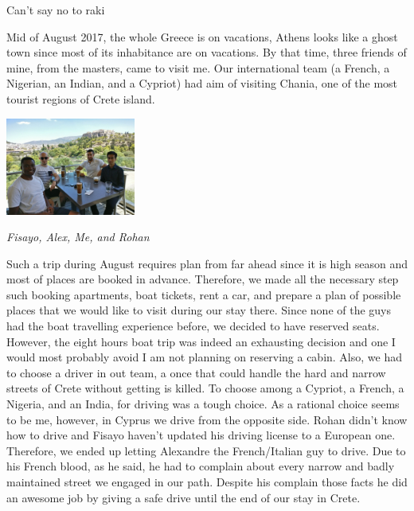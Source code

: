 \documentclass[10pt,a4paper]{article} %
\newcommand{\NewsItem}[1]{ %
\usefont{T1}{fvs}{n}{n} %
\vspace{24pt}\large #1\vspace{3pt} %
\par \normalsize \normalfont}
\begin{document}
\begin{multicols}{3}
\NewsItem{Can't say no to raki}

Mid of August 2017, the whole Greece is on vacations, Athens looks like a ghost 
town since most of its inhabitance are on vacations. 
By that time, three friends of mine, from the masters, came to visit me. 
Our international team (a French, a Nigerian, an Indian, and a Cypriot) had aim 
of visiting Chania, one of the most tourist regions of Crete island.   
 

\begin{center}
	\includegraphics[width=0.32\textwidth]{media/chania_1.jpg}
	\par\textit{Fisayo, Alex, Me, and Rohan}
\end{center}


Such a trip during August requires plan from far ahead since it is high season 
and most of places are booked in advance. 
Therefore, we made all the necessary step such booking apartments, boat tickets, 
rent a car, and prepare a plan of possible places that we would like to visit 
during our stay there. 
Since none of the guys had the boat travelling experience before, we decided 
to have reserved seats. 
However, the eight hours boat trip was indeed an exhausting decision and one 
I would most probably avoid I am not planning on reserving a cabin.  
Also, we had to choose a driver in out team, a once that could handle the 
hard and narrow streets of Crete without getting is killed. 
To choose among a Cypriot, a French, a Nigeria, and an India, for driving 
was a tough choice. 
As a rational choice seems to be me, however, in Cyprus we drive from the 
opposite side. 
Rohan didn't know how to drive and Fisayo haven't updated his driving license 
to a European one. 
Therefore, we ended up letting Alexandre the French/Italian guy to drive. 
Due to his French blood, as he said, he had to complain about every narrow and 
badly maintained street we engaged in our path. 
Despite his complain those facts he did an awesome job by giving a safe drive 
until the end of our stay in Crete. 



\end{multicols}
\end{document}
